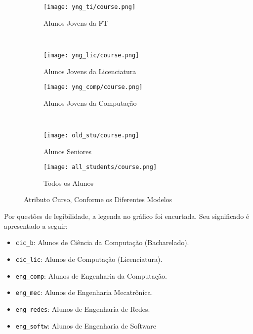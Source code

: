 \clearpage
\begin{figure}[!ht]
    \centering
    \begin{subfigure}[b]{0.48\textwidth}
        \centering
        \texttt{[image: yng\_ti/course.png]}
        \caption{Alunos Jovens da FT}
    \end{subfigure}
    ~
    \begin{subfigure}[b]{0.48\textwidth}
        \centering
        \texttt{[image: yng\_lic/course.png]}
        \caption{Alunos Jovens da Licenciatura}
    \end{subfigure}

    \begin{subfigure}[b]{0.48\textwidth}
        \centering
        \texttt{[image: yng\_comp/course.png]}
        \caption{Alunos Jovens da Computação}
    \end{subfigure}
    ~
    \begin{subfigure}[b]{0.48\textwidth}
        \centering
        \texttt{[image: old\_stu/course.png]}
        \caption{Alunos Seniores}
    \end{subfigure}

    \begin{subfigure}[b]{0.48\textwidth}
        \centering
        \texttt{[image: all\_students/course.png]}
        \caption{Todos os Alunos}
    \end{subfigure}
    \caption{Atributo Curso, Conforme os Diferentes Modelos}
\end{figure}

Por questões de legibilidade, a legenda no gráfico foi encurtada. Seu significado é
apresentado a seguir: 
\begin{itemize}
    \item \texttt{cic\_b}: Alunos de Ciência da Computação (Bacharelado).
    \item \texttt{cic\_lic}: Alunos de Computação (Licenciatura).
    \item \texttt{eng\_comp}: Alunos de Engenharia da Computação.
    \item \texttt{eng\_mec}: Alunos de Engenharia Mecatrônica.
    \item \texttt{eng\_redes}: Alunos de Engenharia de Redes. 
    \item \texttt{eng\_softw}: Alunos de Engenharia de Software
\end{itemize}

